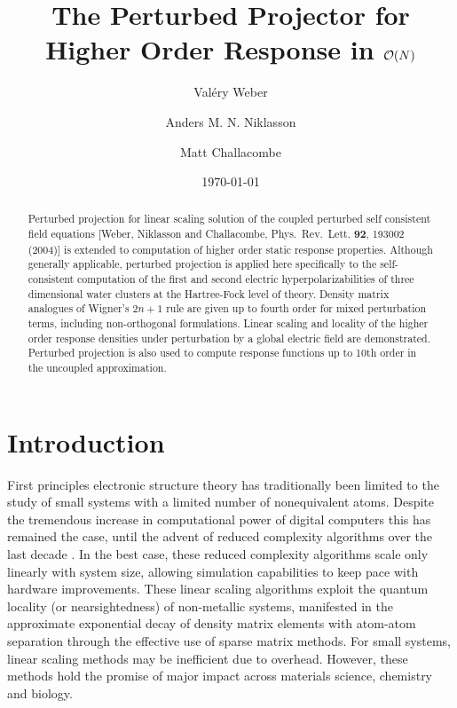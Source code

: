 \documentclass[prl,aps,letterpaper,twocolumn,showpacs,twocolumngrid,superbib]{revtex4}
\begin{document}
\title{The Perturbed Projector for Higher Order Response in ${\cal O}(N)$} 

\author{Val\'ery Weber}
\author{Anders M. N. Niklasson}
\author{Matt Challacombe}

\date{\today}

\begin{abstract}
Perturbed projection  for linear scaling solution of the coupled perturbed 
self consistent field equations 
[Weber, Niklasson and  Challacombe, Phys.\ Rev.\ Lett. {\bf 92}, 193002 (2004)] 
is extended to computation of higher order static response properties.
Although generally applicable, perturbed projection is applied here specifically to the 
self-consistent computation of the first and second electric hyperpolarizabilities 
of three dimensional water clusters at the Hartree-Fock level of theory. 
Density matrix analogues of Wigner's $2n+1$ rule are given up to fourth order for 
mixed perturbation terms, including non-orthogonal formulations.
Linear scaling and locality of the higher order response densities under perturbation 
by a global electric field are demonstrated.  Perturbed projection is also used to compute 
response functions up to 10th order in the uncoupled approximation.  
\end{abstract}

\maketitle




\section{Introduction}
First principles electronic structure theory has traditionally been limited 
to the study of small systems with a limited number of nonequivalent atoms. 
Despite the tremendous increase in computational power of digital computers this 
has remained the case, until the advent of reduced complexity algorithms over the
last decade \cite{GGalli96,DBowler97,SGoedecker99,POrdejon00,VGogonea01,SWu02}. In the 
best case, these reduced complexity algorithms scale only linearly with system size, 
allowing simulation capabilities to keep pace with hardware improvements.
These linear scaling algorithms exploit the quantum locality (or nearsightedness) of 
non-metallic systems,  manifested in the approximate exponential decay of density matrix elements 
with atom-atom separation through the effective use of sparse matrix methods. For small systems,
linear scaling methods may be inefficient due to overhead.  However, these methods hold the promise 
of major impact across materials science, chemistry and biology. 
\end{document}
